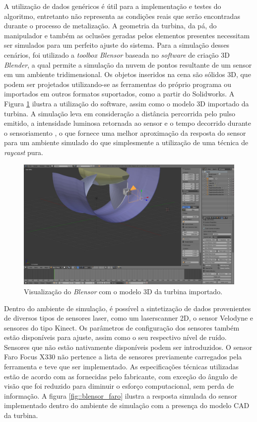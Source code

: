 A utilização de dados genéricos é útil para a implementação e testes do
algoritmo, entretanto não representa as condições reais que serão encontradas
durante o processo de metalização. A geometria da turbina, da pá, do manipulador
e também as oclusões geradas pelos elementos presentes necessitam ser simulados
para um perfeito ajuste do sistema. Para a simulação desses cenários, foi
utilizado a \textit{toolbox Blensor}\footnotemark
{} baseada no \textit{software} de criação 3D
\textit{Blender}\footnotemark,  a qual
permite a simulação da nuvem de pontos resultante de um sensor em um ambiente
tridimensional. Os objetos inseridos na cena são sólidos 3D, que podem ser
projetados utilizando-se as ferramentas do próprio programa ou importados em outros formatos suportados, como a partir do
Solidworks\textregistered. A Figura \ref{fig::blensor_screen}
ilustra a utilização do software, assim como o modelo 3D importado da turbina.
A simulação leva em consideração a distância percorrida pelo pulso emitido, a
intensidade luminosa retornada ao sensor e o tempo decorrido durante o
sensoriamento \cite{Gschwandtner2011}, o que fornece uma melhor aproximação da
resposta do sensor para um ambiente simulado do que simplesmente a utilização de
uma técnica de \textit{raycast} pura.

\begin{figure}[h!]
	\centering
	\includegraphics[width=0.9\columnwidth]{figs/calibracao/blensor_screen}
	\caption{Visualização do \textit{Blensor} com o modelo 3D da turbina
	importado.}
    \label{fig::blensor_screen}
\end{figure}

Dentro do ambiente de simulação, é possível a sintetização de dados provenientes
de diversos tipos de sensores laser, como um laserscanner 2D, o sensor
Velodyne e sensores do tipo Kinect. Os parâmetros de configuração
dos sensores também estão disponíveis para ajuste, assim como o seu respectivo
nível de ruído.
Sensores que não estão nativamente disponíveis podem ser introduzidos. O sensor Faro Focus X330 não
pertence a lista de sensores previamente carregados pela ferramenta e teve que
ser implementado. As especificações técnicas utilizadas estão de acordo com as
fornecidas pelo fabricante, com exceção do ângulo de visão que foi reduzido para
diminuir o esforço computacional, sem perda de informação. A figura
\ref{fig::blensor_faro} ilustra a resposta simulada do sensor implementado
dentro do ambiente de simulação com a presença do modelo CAD da turbina.


